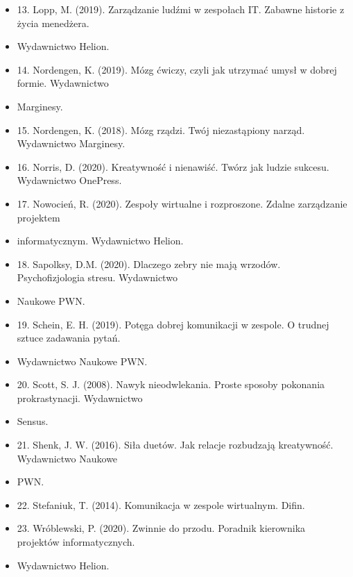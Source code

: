 \documentclass[12pt, a4paper]{article}
\begin{document}
\begin{itemize}
  \item 13. Lopp, M. (2019). Zarządzanie ludźmi w zespołach IT. Zabawne historie z życia menedżera.
  \item Wydawnictwo Helion.
  \item 14. Nordengen, K. (2019). Mózg ćwiczy, czyli jak utrzymać umysł w dobrej formie. Wydawnictwo
  \item Marginesy.
  \item 15. Nordengen, K. (2018). Mózg rządzi. Twój niezastąpiony narząd. Wydawnictwo Marginesy.
  \item 16. Norris, D. (2020). Kreatywność i nienawiść. Twórz jak ludzie sukcesu. Wydawnictwo OnePress.
  \item 17. Nowocień, R. (2020). Zespoły wirtualne i rozproszone. Zdalne zarządzanie projektem
  \item informatycznym. Wydawnictwo Helion.
  \item 18. Sapolksy, D.M. (2020). Dlaczego zebry nie mają wrzodów. Psychofizjologia stresu. Wydawnictwo
  \item Naukowe PWN.
  \item 19. Schein, E. H. (2019). Potęga dobrej komunikacji w zespole. O trudnej sztuce zadawania pytań.
  \item Wydawnictwo Naukowe PWN.
  \item 20. Scott, S. J. (2008). Nawyk nieodwlekania. Proste sposoby pokonania prokrastynacji. Wydawnictwo
  \item Sensus.
  \item 21. Shenk, J. W. (2016). Siła duetów. Jak relacje rozbudzają kreatywność. Wydawnictwo Naukowe
  \item PWN.
  \item 22. Stefaniuk, T. (2014). Komunikacja w zespole wirtualnym. Difin.
  \item 23. Wróblewski, P. (2020). Zwinnie do przodu. Poradnik kierownika projektów informatycznych.
  \item Wydawnictwo Helion.
\end{itemize}
\end{document}
